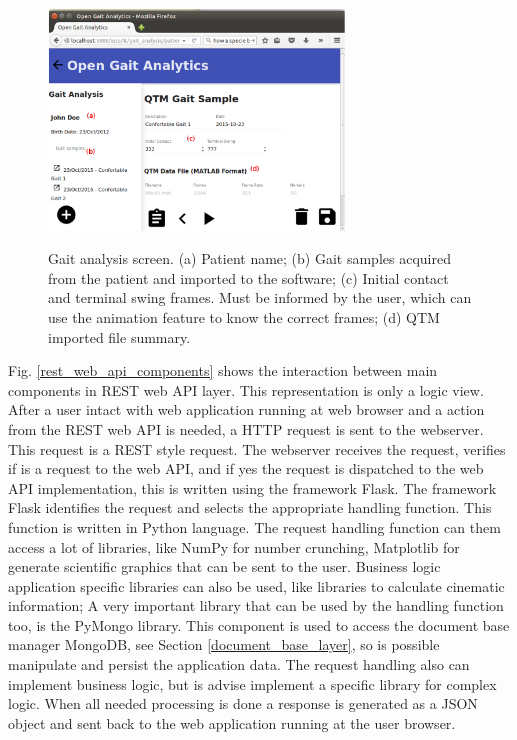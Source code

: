 \documentclass[journal]{IEEEtran}
\begin{document}
\begin{figure}[tb]
	\centering
	{\includegraphics[width=0.7\textwidth]{./qtm_data.eps}}
	\caption{Gait analysis screen. 
		(a) Patient name;
		(b) Gait samples acquired from the patient and imported to the software;
		(c) Initial contact and terminal swing frames. Must be informed by the user,
		which can use the animation feature to know the correct frames;
		(d) QTM imported file summary.
	}
	\label{qtm_data}
\end{figure}

Fig. \ref{rest_web_api_components} shows the interaction between  main components in REST web API layer.
This representation is only a logic view.
After a user intact with web application running at web browser and a action from the REST web API is
needed, a HTTP request is sent to the webserver. This request is a REST style request.
The webserver receives the request, verifies if is a request to the web API, and if yes the
request is dispatched to the web API implementation, this is written using the framework Flask.
The framework Flask identifies the request and selects the appropriate handling function. 
This function is written in Python language. 
The request handling function can them access a lot of libraries, like NumPy for number crunching,
Matplotlib for generate scientific graphics that can be sent to the user. 
Business logic application specific libraries can also be used, like libraries to calculate
cinematic information;
A very important library that can be used by the handling function too, is the PyMongo library.
This component is used to access the document base manager MongoDB, see Section \ref{document_base_layer},
so is possible manipulate and persist the application data.
The request handling also can implement business logic, but is advise implement a specific library for
complex logic. 
When all needed processing is done a response is generated as a JSON object and sent back to 
the web application running at the user browser.
\end{document}
